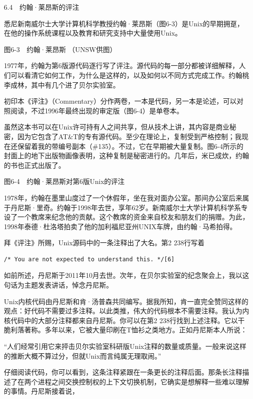 \documentclass[a4paper,12pt,UTF8,twoside]{ctexbook}
\begin{document}
6.4　约翰·莱昂斯的评注


悉尼新南威尔士大学计算机科学教授约翰·莱昂斯（图6-3）是Unix的早期拥趸，在他的操作系统课程以及教育和研究支持中大量使用Unix。



图6-3　约翰·莱昂斯 （UNSW供图）

1977年，约翰为第6版源代码逐行写了评注。源代码的每一部分都被详细解释，人们可以看清它如何工作，为什么是这样的，以及如何以不同方式完成工作。约翰桃李成林，其中有几个进了贝尔实验室。

初印本《评注》（Commentary）分作两卷，一本是代码，另一本是论述，可以对照阅读，不过1996年最终出现的审定版（图6-4）是单卷本。

虽然这本书可以在Unix许可持有人之间共享，但从技术上讲，其内容是商业秘密，因为它包含了AT\&T的专有源代码。至少在理论上，复制受到严格控制；我现在还保留着我的带编号副本（\#135）。不过，它在早期被大量复制。图6-4所示的封面上的地下出版物画像表明，这种复制是秘密进行的。几年后，米已成炊，约翰的书也正式出版了。



图6-4　约翰·莱昂斯对第6版Unix的评注

1978年，约翰在墨里山度过了一个休假年，坐在我对面办公室。那间办公室后来属于丹尼斯·里奇。约翰于1998年去世，享年62岁。新南威尔士大学计算机科学系专设了一个教席来纪念他的贡献。这个教席的资金来自校友和朋友们的捐赠。为此，1998年泰德·杜洛塔拍卖了他的加利福尼亚州UNIX车牌，由约翰·马希拍得。

拜《评注》所赐，Unix源码中的一条注释出了大名。第2 238行写着
\begin{lstlisting}
/* You are not expected to understand this. */[6]
\end{lstlisting}
如前所述，丹尼斯于2011年10月去世。次年，在贝尔实验室的纪念聚会上，我以这句话为主题发表讲话，悼念丹尼斯。

Unix内核代码由丹尼斯和肯·汤普森共同编写。据我所知，肯一直完全赞同这样的观点：好代码不需要过多注释。以此类推，伟大的代码根本不需要注释。我认为内核代码中的大部分注释都来自丹尼斯。你可以在第2 238行找到上述注释。它以干脆利落著称。多年以来，它被大量印刷在T恤衫之类地方。正如丹尼斯本人所说：

“人们经常引用它来抨击贝尔实验室科研版Unix注释的数量或质量。一般来说这样的推断大概不算过分，但就Unix而言纯属无理取闹。”



仔细阅读代码，你可以看到，这条注释紧跟在一条更长的注释后面。那条长注释描述了在两个进程之间交换控制权的上下文切换机制，它确实是想解释一些难以理解的事情。丹尼斯接着说，
\end{document}
